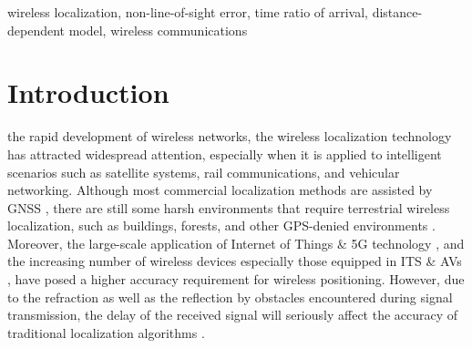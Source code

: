 \documentclass[journal]{IEEEtran}
\begin{document}
   \begin{IEEEkeywords}
 wireless localization, non-line-of-sight error, time ratio of arrival, distance-dependent model, wireless communications
   \end{IEEEkeywords}

%
\IEEEpeerreviewmaketitle



\section{Introduction}
%
%
%
%
 the rapid development of wireless networks, the wireless localization technology has attracted widespread attention, especially when it is applied to intelligent scenarios such as satellite systems\cite{re1}, rail communications\cite{re2}, and vehicular networking\cite{re3,re4}. Although most commercial localization methods are assisted by GNSS \cite{re5,re6}, there are still some harsh environments that require terrestrial wireless localization, such as buildings, forests, and other GPS-denied environments \cite{re7}. Moreover, the large-scale application of Internet of Things \cite{re8} \& 5G technology \cite{re9,re10}, and the increasing number of wireless devices especially those equipped in ITS \& AVs \cite{re4,re6,re11}, have posed a higher accuracy requirement for wireless positioning. However, due to the refraction as well as the reflection by obstacles encountered during signal transmission, the delay of the received signal will seriously affect the accuracy of traditional localization algorithms \cite{re7}.
\end{document}
